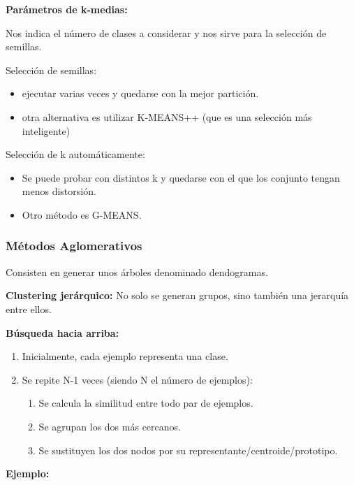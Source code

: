 \documentclass[12pt]{report} %
\begin{document}
\textbf{Parámetros de k-medias:}

Nos indica el número de clases a considerar y nos sirve para la selección de semillas.

Selección de semillas:
\begin{itemize}
  \item ejecutar varias veces y quedarse con la mejor partición.
  \item otra alternativa es utilizar K-MEANS++ (que es una selección más inteligente)
\end{itemize}

Selección de k automáticamente:
\begin{itemize}
  \item Se puede probar con distintos k y quedarse con el que los conjunto tengan menos distorsión.
  \item Otro método es G-MEANS.
\end{itemize}

\newpage

\subsubsection{Métodos Aglomerativos}

Consisten en generar unos árboles denominado dendogramas.

\textbf{Clustering jerárquico:} No solo se generan grupos, sino también una jerarquía entre ellos.

\textbf{Búsqueda hacia arriba:} 
\begin{enumerate}
  \item Inicialmente, cada ejemplo representa una clase.
  \item Se repite N-1 veces (siendo N el número de ejemplos):
  \begin{enumerate}
    \item Se calcula la similitud entre todo par de ejemplos.
    \item Se agrupan los dos más cercanos.
    \item Se sustituyen los dos nodos por su representante/centroide/prototipo.
  \end{enumerate}
\end{enumerate}

\textbf{Ejemplo:}
\end{document}
